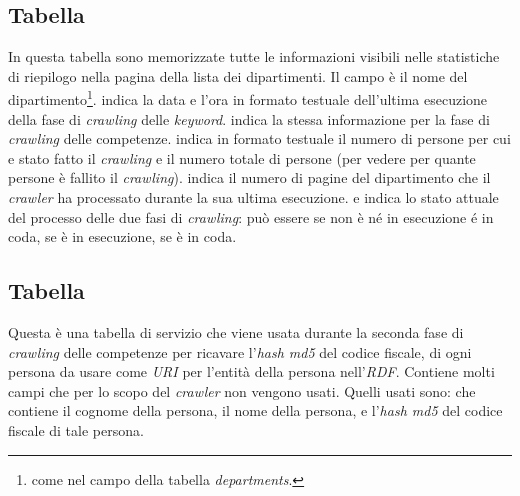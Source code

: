 \documentclass[tesi.tex]{subfiles}
\begin{document}
\subsection{Tabella }
\begin{center}
\end{center}
In questa tabella sono memorizzate tutte le informazioni visibili
nelle statistiche di riepilogo nella pagina della lista dei
dipartimenti. Il campo  \`e il nome del
dipartimento\footnote{come nel campo  della tabella
\emph{departments}.}.  indica la data e l'ora in
formato testuale dell'ultima esecuzione della fase di \emph{crawling}
delle \emph{keyword}.  indica la stessa informazione per la fase di
\emph{crawling} delle competenze.  indica in formato
testuale il numero di persone per cui e stato fatto il \emph{crawling}
e il numero totale di persone (per vedere per quante persone \`e
fallito il \emph{crawling}).  indica il numero di pagine
del dipartimento che il \emph{crawler} ha processato durante la sua ultima
esecuzione.  e  indica lo
stato attuale del processo delle due fasi di \emph{crawling}: pu\`o
essere  se non \`e n\'e in esecuzione \'e in coda,
 se \`e in esecuzione,  se \`e in coda.

\subsection{Tabella }\label{sec:tabellacarriera}
\begin{center}
\end{center}
Questa \`e una tabella di servizio che viene usata durante la seconda
fase di \emph{crawling} delle competenze per ricavare l'\emph{hash md5} del codice fiscale, di ogni persona da
usare come \emph{URI} per l'entit\`a della persona
nell'\emph{RDF}. Contiene molti campi che per lo scopo del
\emph{crawler} non vengono usati. Quelli usati sono:  che
contiene 
il cognome della persona,  il nome della persona, e
 l'\emph{hash md5} del codice fiscale di tale persona.
\end{document}

